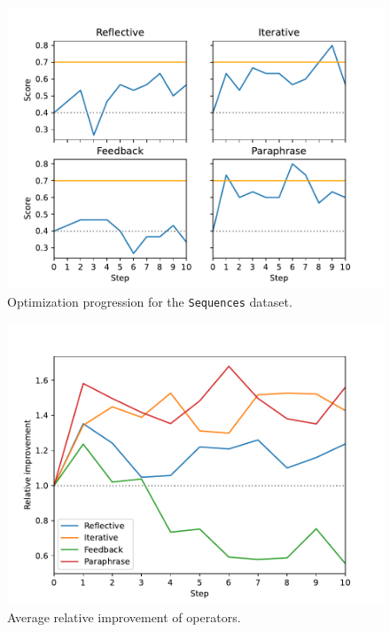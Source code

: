 \begin{table}[htbp]
\begin{tabular}{|c||c|c|c|c|}
    \end{tabular}
\end{table}


\begin{figure}
    \includegraphics[width=\linewidth]{sequences.pdf}
    \caption{Optimization progression for the \texttt{Sequences} dataset.}
    \label{fig:sequences}
\end{figure}

\begin{figure}
    \includegraphics[width=\linewidth]{relative.pdf}
    \caption{Average relative improvement of operators.}
    \label{fig:relative}
\end{figure}

